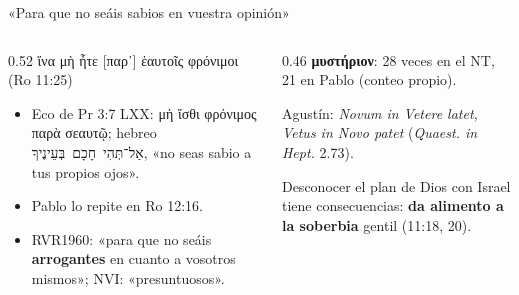 \documentclass[hyperref={bookmarks=false},aspectratio=169]{beamer}
\newcommand{\heb}[1]{\mbox{\foreignlanguage{hebrew}{#1}}}
\newcommand{\grc}[1]{\foreignlanguage{ancientgreek}{#1}}
\begin{document}
\begin{frame}{«Para que no seáis sabios en vuestra opinión»}
\begin{columns}[T,onlytextwidth]
\begin{column}{0.52\textwidth}\scriptsize\RaggedRight
\grc{ἵνα μὴ ἦτε [παρ᾿] ἑαυτοῖς φρόνιμοι} (Ro 11:25)\par\smallskip
\begin{itemize}
\item Eco de Pr 3:7 LXX: \grc{μὴ ἴσθι φρόνιμος παρὰ σεαυτῷ}; hebreo \heb{אַל־תְּהִי חָכָם בְּעֵינֶיךָ}, «no seas sabio a tus propios ojos».
\item Pablo lo repite en Ro 12:16.
\item RVR1960: «para que no seáis \textbf{arrogantes} en cuanto a vosotros mismos»; NVI: «presuntuosos».
\end{itemize}
\end{column}
\begin{column}{0.46\textwidth}\scriptsize\RaggedRight
\textbf{\textcolor{cafe}{\grc{μυστήριον}}}: 28 veces en el NT, 21 en Pablo (conteo propio).\par\smallskip
Agustín: \emph{Novum in Vetere latet, Vetus in Novo patet} (\emph{Quaest. in Hept.} 2.73).\par\medskip
\begin{tcolorbox}[colback=piedra,colframe=ladrillo,boxrule=0.8pt,arc=2pt,fontupper=\scriptsize]
Desconocer el plan de Dios con Israel tiene consecuencias: \textbf{da alimento a la soberbia} gentil (11:18, 20).
\end{tcolorbox}
\end{column}
\end{columns}
\end{frame}
\end{document}

